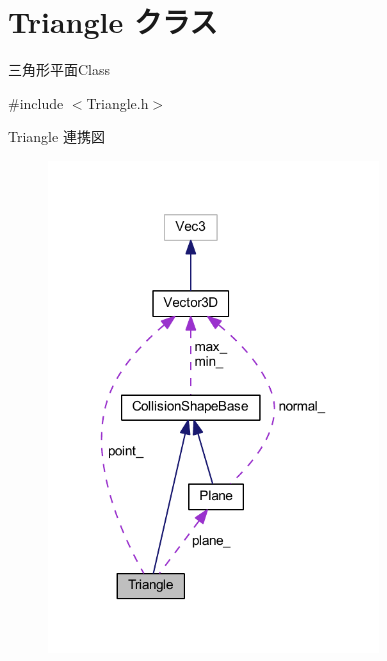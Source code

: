 \hypertarget{class_triangle}{}\section{Triangle クラス}
\label{class_triangle}


三角形平面\+Class  




{\ttfamily \#include $<$Triangle.\+h$>$}



Triangle 連携図\nopagebreak
\begin{figure}[H]
\begin{center}
\leavevmode
\includegraphics[width=248pt]{class_triangle__coll__graph}
\end{center}
\end{figure}

